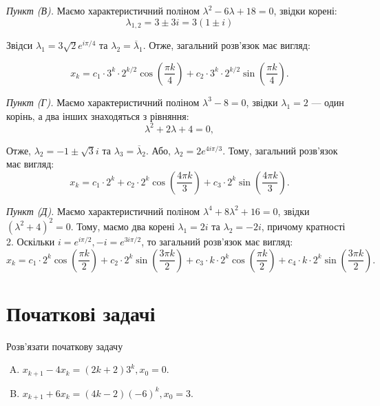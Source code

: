 \documentclass{hw_template}
\begin{document}
\textit{Пункт (В).} Маємо характеристичний поліном $\lambda^2-6\lambda+18=0$, звідки корені:
\begin{equation*}
    \lambda_{1,2} = 3 \pm 3i = 3(1 \pm i)
\end{equation*}

Звідси $\lambda_1 = 3\sqrt{2}e^{i\pi/4}$ та $\lambda_2 = \overline{\lambda}_1$. Отже, загальний розв'язок має вигляд:

\begin{equation*}
    x_k = c_1 \cdot 3^k \cdot 2^{k/2}\cos\left(\frac{\pi k}{4}\right) + c_2\cdot 3^{k} \cdot 2^{k/2}\sin\left(\frac{\pi k}{4}\right).
\end{equation*}

\textit{Пункт (Г).} Маємо характеристичний поліном $\lambda^3-8=0$, звідки $\lambda_1=2$ --- один корінь, а два інших знаходяться з рівняння:
\begin{equation*}
    \lambda^2 + 2\lambda + 4 = 0,
\end{equation*}

Отже, $\lambda_2 = -1 \pm \sqrt{3}i$ та $\lambda_3 = \overline{\lambda}_2$. Або, $\lambda_2 = 2e^{4i\pi/3}$. Тому, загальний розв'язок має вигляд:
\begin{equation*}
    x_k = c_1 \cdot 2^k + c_2 \cdot 2^k\cos\left(\frac{4\pi k}{3}\right) + c_3 \cdot 2^k\sin\left(\frac{4\pi k}{3}\right).
\end{equation*}

\textit{Пункт (Д).} Маємо характеристичний поліном $\lambda^4+8\lambda^2+16=0$, звідки $(\lambda^2+4)^2=0$. Тому, маємо два корені $\lambda_1 = 2i$ та $\lambda_2 = -2i$, причому кратності 2. Оскільки $i=e^{i\pi/2}, -i = e^{3i\pi/2}$, то загальний розв'язок має вигляд:
\begin{equation*}
    x_k = c_1 \cdot 2^{k}\cos\left(\frac{\pi k}{2}\right) + c_2\cdot 2^{k}\sin\left(\frac{3\pi k}{2}\right) + c_3 \cdot k \cdot 2^{k}\cos\left(\frac{\pi k}{2}\right) + c_4 \cdot k \cdot 2^{k}\sin\left(\frac{3\pi k}{2}\right).
\end{equation*}

\section{Початкові задачі}

\begin{problem}
    Розв’язати початкову задачу
    \begin{enumerate}[(A)]
        \item $x_{k+1}-4x_k = (2k+2)3^k, x_0=0$.
        \item $x_{k+1}+6x_k = (4k-2)(-6)^k, x_0=3$.
    \end{enumerate}
\end{problem}
\end{document}
